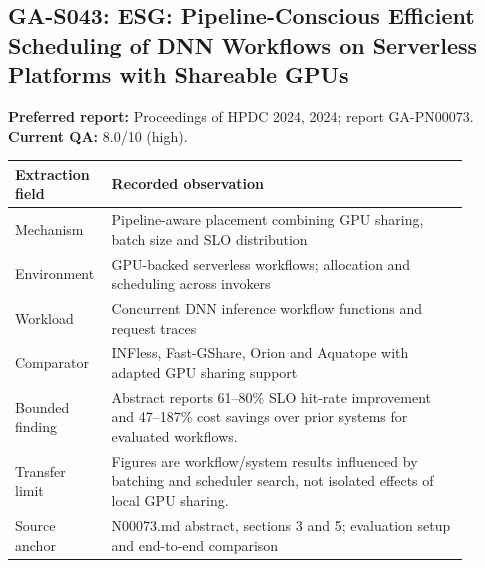 \subsection{GA-S043: ESG: Pipeline-Conscious Efficient Scheduling of DNN Workflows on Serverless Platforms with Shareable GPUs}
\textbf{Preferred report:} Proceedings of HPDC 2024, 2024; report GA-PN00073. \textbf{Current QA:} 8.0/10 (high).
\begin{longtable}{P{0.15\linewidth}P{0.75\linewidth}}
\toprule Extraction field & Recorded observation\\\midrule\endhead
Mechanism & Pipeline-aware placement combining GPU sharing, batch size and SLO distribution\\
Environment & GPU-backed serverless workflows; allocation and scheduling across invokers\\
Workload & Concurrent DNN inference workflow functions and request traces\\
Comparator & INFless, Fast-GShare, Orion and Aquatope with adapted GPU sharing support\\
Bounded finding & Abstract reports 61–80\% SLO hit-rate improvement and 47–187\% cost savings over prior systems for evaluated workflows.\\
Transfer limit & Figures are workflow/system results influenced by batching and scheduler search, not isolated effects of local GPU sharing.\\
Source anchor & N00073.md abstract, sections 3 and 5; evaluation setup and end-to-end comparison\\
\bottomrule\end{longtable}

